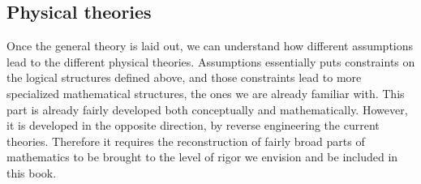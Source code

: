 \documentclass[11pt,letterpaper,fleqn]{memoir} %
\begin{document}
\subsection{Physical theories}

Once the general theory is laid out, we can understand how different assumptions lead to the different physical theories. Assumptions essentially puts constraints on the logical structures defined above, and those constraints lead to more specialized mathematical structures, the ones we are already familiar with. This part is already fairly developed both conceptually and mathematically. However, it is developed in the opposite direction, by reverse engineering the current theories. Therefore it requires the reconstruction of fairly broad parts of mathematics to be brought to the level of rigor we envision and be included in this book.
\end{document}
